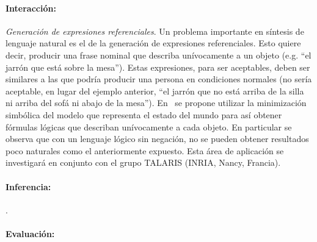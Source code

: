 \paragraph{Interacci\'on:}

\emph{Generaci\'on de expresiones referenciales}. Un problema importante en
s\'intesis de lenguaje natural es el de la generaci\'on de expresiones
referenciales. Esto quiere decir, producir una frase nominal que describa
un\'ivocamente a un objeto (e.g. ``el jarr\'on que est\'a sobre la mesa'').
Estas expresiones, para ser aceptables, deben ser similares a las que podr\'ia
producir una persona en condiciones normales (no ser\'ia aceptable, en lugar del
ejemplo anterior, ``el jarr\'on que no est\'a arriba de la silla ni arriba del
sof\'a ni abajo de la mesa'').  En~\cite{AKS08} se propone utilizar la
minimizaci\'on simb\'olica del modelo que representa
el estado del mundo para as\'i obtener f\'ormulas l\'ogicas que describan
un\'ivocamente a cada objeto. En particular se observa que con un
lenguaje l\'ogico sin negaci\'on, no se pueden obtener resultados poco
naturales como el anteriormente expuesto. Esta \'area de aplicaci\'on se
investigar\'a en conjunto con el grupo TALARIS (INRIA,
Nancy, Francia).

\paragraph{Inferencia:}
\citep{arec:logi00}.


\paragraph{Evaluaci\'on:}



